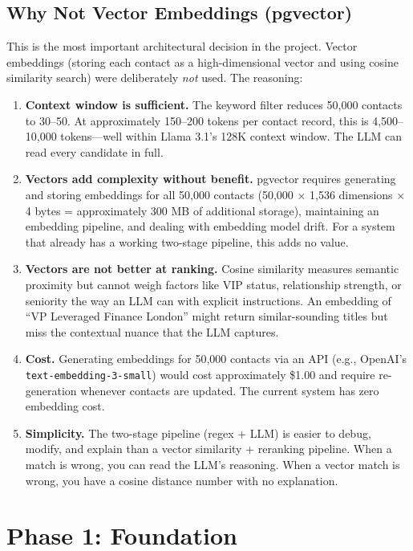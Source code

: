 \documentclass[12pt, a4paper]{report}
\begin{document}
\section{Why Not Vector Embeddings (pgvector)}

This is the most important architectural decision in the project. Vector embeddings (storing each contact as a high-dimensional vector and using cosine similarity search) were deliberately \emph{not} used. The reasoning:

\begin{enumerate}[itemsep=4pt]
    \item \textbf{Context window is sufficient.} The keyword filter reduces 50,000 contacts to 30--50. At approximately 150--200 tokens per contact record, this is 4,500--10,000 tokens---well within Llama 3.1's 128K context window. The LLM can read every candidate in full.
    \item \textbf{Vectors add complexity without benefit.} pgvector requires generating and storing embeddings for all 50,000 contacts (50,000 $\times$ 1,536 dimensions $\times$ 4 bytes = approximately 300 MB of additional storage), maintaining an embedding pipeline, and dealing with embedding model drift. For a system that already has a working two-stage pipeline, this adds no value.
    \item \textbf{Vectors are not better at ranking.} Cosine similarity measures semantic proximity but cannot weigh factors like VIP status, relationship strength, or seniority the way an LLM can with explicit instructions. An embedding of ``VP Leveraged Finance London'' might return similar-sounding titles but miss the contextual nuance that the LLM captures.
    \item \textbf{Cost.} Generating embeddings for 50,000 contacts via an API (e.g., OpenAI's \texttt{text-embedding-3-small}) would cost approximately \$1.00 and require re-generation whenever contacts are updated. The current system has zero embedding cost.
    \item \textbf{Simplicity.} The two-stage pipeline (regex + LLM) is easier to debug, modify, and explain than a vector similarity + reranking pipeline. When a match is wrong, you can read the LLM's reasoning. When a vector match is wrong, you have a cosine distance number with no explanation.
\end{enumerate}

\chapter{Phase 1: Foundation}
\end{document}
